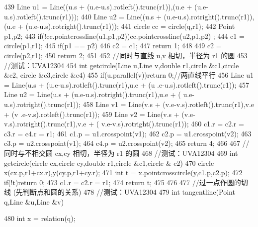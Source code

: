 \documentclass[11pt]{article}
\begin{document}
\begin{Code}
{{439              Line u1 = Line((u.s + (u.e-u.s).rotleft().trunc(r1)),(u.e +
                     (u.e-u.s).rotleft().trunc(r1)));
440              Line u2 = Line((u.s + (u.e-u.s).rotright().trunc(r1)),(u.e
                    + (u.e-u.s).rotright().trunc(r1)));
441              circle cc = circle(q,r1);
442              Point p1,p2;
443              if(!cc.pointcrossline(u1,p1,p2))cc.pointcrossline(u2,p1,p2)
                    ;
444              c1 = circle(p1,r1);
445              if(p1 == p2){
446                   c2 = c1;
447                   return 1;
448              }
449              c2 = circle(p2,r1);
450              return 2;
451       }
452       //同时与直线 u,v 相切，半径为 r1 的圆
453       //测试：UVA12304
454       int getcircle(Line u,Line v,double r1,circle &c1,circle &c2,
             circle &c3,circle &c4){
455           if(u.parallel(v))return 0;//两直线平行
456           Line u1 = Line(u.s + (u.e-u.s).rotleft().trunc(r1),u.e + (u
                 .e-u.s).rotleft().trunc(r1));
457           Line u2 = Line(u.s + (u.e-u.s).rotright().trunc(r1),u.e + (
                 u.e-u.s).rotright().trunc(r1));
458           Line v1 = Line(v.s + (v.e-v.s).rotleft().trunc(r1),v.e + (v
                 .e-v.s).rotleft().trunc(r1));
459           Line v2 = Line(v.s + (v.e-v.s).rotright().trunc(r1),v.e + (
                 v.e-v.s).rotright().trunc(r1));
460           c1.r = c2.r = c3.r = c4.r = r1;
461           c1.p = u1.crosspoint(v1);
462           c2.p = u1.crosspoint(v2);
463           c3.p = u2.crosspoint(v1);
464           c4.p = u2.crosspoint(v2);
465           return 4;
466       }
467       //同时与不相交圆 cx,cy 相切，半径为 r1 的圆
468       //测试：UVA12304
469       int getcircle(circle cx,circle cy,double r1,circle &c1,circle &
             c2){
470           circle x(cx.p,r1+cx.r),y(cy.p,r1+cy.r);
471           int t = x.pointcrosscircle(y,c1.p,c2.p);
472           if(!t)return 0;
473           c1.r = c2.r = r1;
474           return t;
475       }
476
477       //过一点作圆的切线 (先判断点和圆的关系)
478       //测试：UVA12304
479       int tangentline(Point q,Line &u,Line &v){
480           int x = relation(q);


}}
\end{Code}
\end{document}
